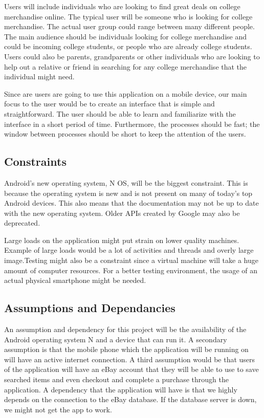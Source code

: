 \documentclass[journal,compsoc, 10pt, draftclsnofoot, onecolumn]{IEEEtran}
\begin{document}
Users will include individuals who are looking to find great deals on college 
merchandise online. The typical user will be someone who is looking for college 
merchandise. The actual user group could range between many different people. 
The main audience should be individuals looking for college merchandise and 
could be incoming college students, or people who are already college students. 
Users could also be parents, grandparents or other individuals who are looking 
to help out a relative or friend in searching for any college merchandise that 
the individual might need. \newline

Since are users are going to use this application on  a mobile device, 
our main focus to the user would be to create an interface that is simple
 and straightforward. The user should be able to learn and familiarize with the interface
 in a short period of time. Furthermore, the processes should be fast; the 
window between processes should be short to keep the attention of the users.

\subsection{Constraints}

Android's new operating system, N OS, will be the biggest constraint. This is 
because the operating system is new and is not present on many of today's top 
Android devices. This also means that the documentation may not be up to date 
with the new operating system. Older APIs created by Google may also be
 deprecated.\newline

Large loads on the application might put strain on lower quality machines. 
Example of large loads would be a lot of activities and threads and overly 
large image.Testing might also be a constraint since a virtual machine will take a huge 
amount of computer resources. For a better testing environment, the usage of an 
actual physical smartphone might be needed.

\subsection{Assumptions and Dependancies}

An assumption and dependency for this project will be the availability of the 
Android operating system N and a device that can run it. A secondary assumption 
is that the mobile phone which the application will be running on will have an 
active internet connection. A third assumption would be that users of the 
application will have an eBay account that they will be able to use to save 
searched items and even checkout and complete a purchase through the 
application. A dependency that the application will have is that we highly 
depends on the connection to the eBay database. If the database server is down, 
we might not get the app to work.
\end{document}
